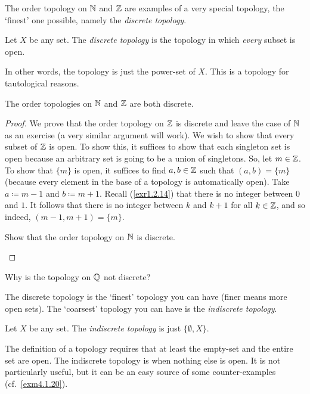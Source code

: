 The order topology on $\mathbb{N}$ and $\mathbb{Z}$ are examples of a very special topology, the `finest' one possible, namely the \emph{discrete topology}.
\begin{dfn}
Let $X$ be any set.  The \emph{discrete topology} is the topology in which \emph{every} subset is open.
\begin{rmk}
In other words, the topology is just the power-set of $X$.  This is a topology for tautological reasons.
\end{rmk}
\end{dfn}
\begin{prp}\label{prp4.1.11}
The order topologies on $\mathbb{N}$ and $\mathbb{Z}$ are both discrete.
\begin{proof}
We prove that the order topology on $\mathbb{Z}$ is discrete and leave the case of $\mathbb{N}$ as an exercise (a very similar argument will work).  We wish to show that every subset of $\mathbb{Z}$ is open.  To show this, it suffices to show that each singleton set is open because an arbitrary set is going to be a union of singletons.  So, let $m\in \mathbb{Z}$.  To show that $\{ m\}$ is open, it suffices to find $a,b\in \mathbb{Z}$ such that $(a,b)=\{ m\}$ (because every element in the base of a topology is automatically open).  Take $a\coloneqq m-1$ and $b\coloneqq m+1$.  Recall (\cref{exr1.2.14}) that there is no integer between $0$ and $1$.  It follows that there is no integer between $k$ and $k+1$ for all $k\in \mathbb{Z}$, and so indeed, $(m-1,m+1)=\{ m\}$.
\begin{exr}
Show that the order topology on $\mathbb{N}$ is discrete.
\end{exr}
\end{proof}
\end{prp}
\begin{exr}
Why is the topology on $\mathbb{Q}$ not discrete?
\end{exr}
The discrete topology is the `finest' topology you can have (finer means more open sets).  The `coarsest' topology you can have is the \emph{indiscrete topology}.
\begin{dfn}\label{dfnIndiscreteTopology}
Let $X$ be any set.  The \emph{indiscrete topology} is just $\{ \emptyset ,X\}$.
\begin{rmk}
The definition of a topology requires that at least the empty-set and the entire set are open.  The indiscrete topology is when nothing else is open.  It is not particularly useful, but it can be an easy source of some counter-examples (cf.~\cref{exm4.1.20}).
\end{rmk}
\end{dfn}


